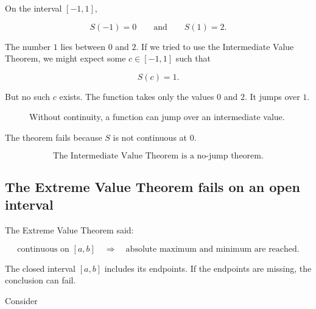 On the interval \([-1,1]\),

\[
S(-1)=0
\qquad\text{and}\qquad
S(1)=2.
\]

The number \(1\) lies between \(0\) and \(2\).  If we tried to use the Intermediate Value Theorem, we might expect some \(c\in[-1,1]\) such that

\[
S(c)=1.
\]

But no such \(c\) exists.  The function takes only the values \(0\) and \(2\).  It jumps over \(1\).

\begin{figure}[h]
\centering
{}
\caption{Without continuity, a function can jump over an intermediate value.}
\label{fig:ivt-warning-fails}
\end{figure}

The theorem fails because \(S\) is not continuous at \(0\).

\[
\boxed{\text{The Intermediate Value Theorem is a no-jump theorem.}}
\]

\subsection{The Extreme Value Theorem fails on an open interval}
\label{subsec:evt-fails-open-interval-warning}

The Extreme Value Theorem said:

\[
\text{continuous on }[a,b]
\quad\Longrightarrow\quad
\text{absolute maximum and minimum are reached.}
\]

The closed interval \([a,b]\) includes its endpoints.  If the endpoints are missing, the conclusion can fail.

Consider

